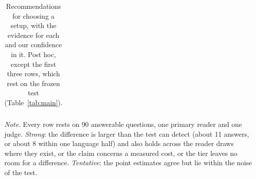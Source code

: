 \begin{table}[t]
\begin{tabularx}{\textwidth}{@{}>{\raggedright\arraybackslash}p{2.5cm}>{\raggedright\arraybackslash}p{4.9cm}>{\raggedright\arraybackslash}X>{\raggedright\arraybackslash}p{1.9cm}@{}}
\bottomrule
\end{tabularx}
\par\smallskip
{\footnotesize\emph{Note.} Every row rests on 90 answerable questions, one primary reader and one judge. \emph{Strong}: the difference is larger than the test can detect (about 11 answers, or about 8 within one language half) and also holds across the reader draws where they exist, or the claim concerns a measured cost, or the tier leaves no room for a difference. \emph{Tentative}: the point estimates agree but lie within the noise of the test.\par}
\caption{Recommendations for choosing a setup, with the evidence for each and our confidence in it. Post hoc, except the first three rows, which rest on the frozen test (Table~\ref{tab:main}).}
\label{tab:guide}
\end{table}
